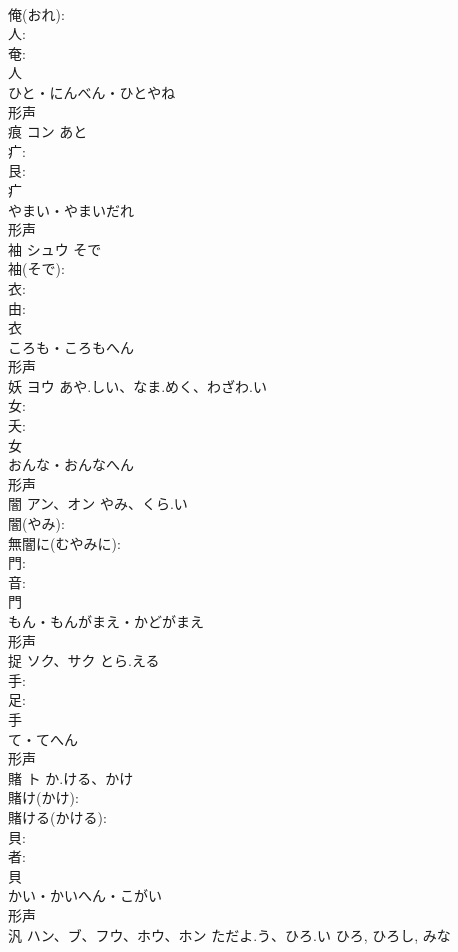 \documentclass[8pt]{extreport}
\begin{document}
\begin{CJK}{UTF8}{min}
\\	俺(おれ): 
\\	人: 
\\	奄: 
\\	人	
\\	ひと・にんべん・ひとやね	
\\	形声 
\\	痕	コン	あと		
\\	疒: 
\\	艮: 
\\	疒	
\\	やまい・やまいだれ	
\\	形声 
\\	袖	シュウ	そで		
\\	袖(そで): 
\\	衣: 
\\	由: 
\\	衣	
\\	ころも・ころもへん	
\\	形声 
\\	妖	ヨウ	あや.しい、なま.めく、わざわ.い		
\\	女: 
\\	夭: 
\\	女	
\\	おんな・おんなへん	
\\	形声 
\\	闇	アン、オン	やみ、くら.い		
\\	闇(やみ): 
\\	無闇に(むやみに): 
\\	門: 
\\	音: 
\\	門	
\\	もん・もんがまえ・かどがまえ	
\\	形声 
\\	捉	ソク、サク	とら.える		
\\	手: 
\\	足: 
\\	手	
\\	て・てへん	
\\	形声 
\\	賭	ト	か.ける、かけ		
\\	賭け(かけ): 
\\	賭ける(かける): 
\\	貝: 
\\	者: 
\\	貝	
\\	かい・かいへん・こがい	
\\	形声 
\\	汎	ハン、ブ、フウ、ホウ、ホン	ただよ.う、ひろ.い	ひろ, ひろし, みな	

\end{CJK}
\end{document}
